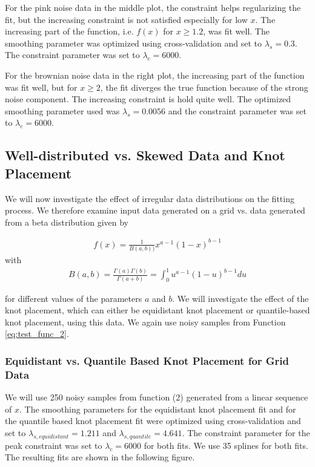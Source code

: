 \documentclass[10pt,a4paper]{article}
\begin{document}
For the pink noise data in the middle plot, the constraint helps regularizing the fit, but the increasing constraint is not satisfied especially for low $x$. The increasing part of the function, i.e. $f(x)$ for $x \ge 1.2$,  was fit well. The smoothing parameter was optimized using cross-validation and set to $\lambda_s = 0.3$. The constraint parameter was set to $\lambda_c = 6000$. 

For the brownian noise data in the right plot, the increasing part of the function was fit well, but for $x \ge 2$, the fit diverges the true function because of the strong noise component. The increasing constraint is hold quite well. The optimized smoothing parameter used was $\lambda_s = 0.0056$ and the constraint parameter was set to $\lambda_c = 6000$.

\subsection{Well-distributed vs. Skewed Data and Knot Placement}
We will now investigate the effect of irregular data distributions on the fitting process. We therefore examine input data generated on a grid vs. data generated from a beta distribution given by

\begin{align}
	f(x) = \frac{1}{B(a, b))} x^{a-1} (1-x)^{b-1} 
\end{align}
with
\begin{align*}
	B(a,b) = \frac{\Gamma(a)\Gamma(b)}{\Gamma(a+b)} = \int_0^1 u^{a-1} (1-u)^{b-1} du
\end{align*}


for different values of the parameters $a$ and $b$. We will investigate the effect of the knot placement, which can either be equidistant knot placement or quantile-based knot placement, using this data. We again use noisy samples from Function \ref{eq:test_func_2}.

\subsubsection{Equidistant vs. Quantile Based Knot Placement for Grid Data}
We will use 250 noisy samples from function (2) generated from a linear sequence of $x$. The smoothing parameters for the equidistant knot placement fit and for the quantile based knot placement fit were optimized using cross-validation and set to $\lambda_{s,equidistant} = 1.211$ and $\lambda_{s, quantile} = 4.641$. The constraint parameter for the peak constraint was set to $\lambda_c = 6000$ for both fits. We use 35 splines for both fits. The resulting fits are shown in the following figure.
\end{document}
